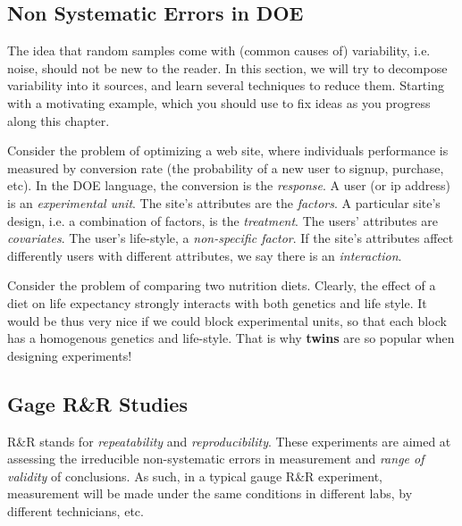 \subsection{Non Systematic Errors in DOE}
\label{sec:variance_components}


The idea that random samples come with (common causes of) variability, i.e. noise, should not be new to the reader.
In this section, we will try to decompose variability into it sources, and learn several techniques to reduce them. 
Starting with a motivating example, which you should use to fix ideas as you progress along this chapter. 



\begin{example}
\label{eg:web_design}
Consider the problem of optimizing a web site, where individuals performance is measured by conversion rate (the probability of a new user to signup, purchase, etc).
In the DOE language, the conversion is the \emph{response}.
A user (or ip address) is an \emph{experimental unit}.
The site's attributes are the \emph{factors}.
A particular site's design, i.e. a combination of factors, is the \emph{treatment}.
The users' attributes are \emph{covariates}. 
The user's life-style, a \emph{non-specific factor}.
If the site's attributes affect differently users with different attributes, we say there is an \emph{interaction}.
\end{example}




\begin{example}
\label{eg:diets}
Consider the problem of comparing two nutrition diets. 
Clearly, the effect of a diet on life expectancy strongly interacts with both genetics and life style. 
It would be thus very nice if we could block experimental units, so that each block has a homogenous genetics and life-style. 
That is why \textbf{twins} are so popular when designing experiments!
\end{example}







\subsection{Gage R\&R Studies}
R\&R stands for \emph{repeatability} and \emph{reproducibility}.
These experiments are aimed at assessing the irreducible non-systematic errors in measurement and \emph{range of validity} of conclusions.
As such, in a typical gauge R\&R experiment, measurement will be made under the same conditions in different labs, by different technicians, etc. 






